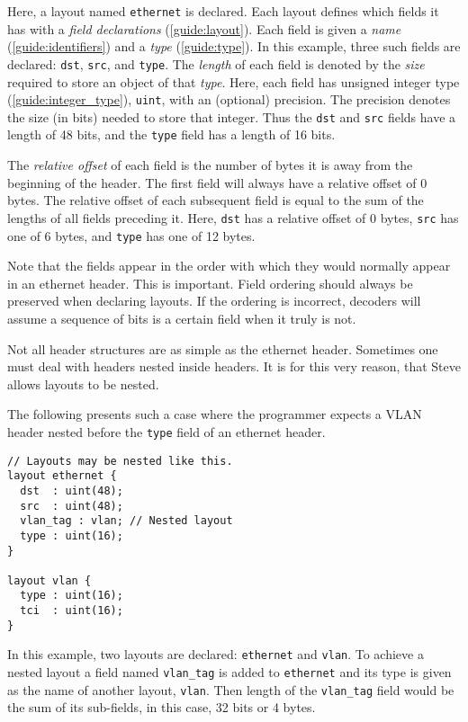 Here, a layout named \texttt{ethernet} is declared. Each layout defines which
fields it has with a \textit{field declarations} (\ref{guide:layout}). Each
field is given a \textit{name} (\ref{guide:identifiers}) and a \textit{type}
(\ref{guide:type}). In this example, three such fields are declared: \texttt{dst},
\texttt{src}, and \texttt{type}. The \textit{length} of each field is denoted by
the \textit{size} required to store an object of that \textit{type}. Here, each
field has unsigned integer type (\ref{guide:integer_type}), \texttt{uint}, with
an (optional) precision. The precision denotes the size (in bits) needed to
store that integer. Thus the \texttt{dst} and \texttt{src} fields have a length
of 48 bits, and the \texttt{type} field has a length of 16 bits.

The \textit{relative offset} of each field is the number of bytes it is away
from the beginning of the header. The first field will always have a relative
offset of 0 bytes. The relative offset of each subsequent field is equal to the
sum of the lengths of all fields preceding it. Here, \texttt{dst} has a relative
offset of 0 bytes, \texttt{src} has one of 6 bytes, and \texttt{type} has one of
12 bytes.

Note that the fields appear in the order with which they would normally appear
in an ethernet header. This is important. Field ordering should always be
preserved when declaring layouts. If the ordering is incorrect, decoders will
assume a sequence of bits is a certain field when it truly is not.

Not all header structures are as simple as the ethernet header. Sometimes one
must deal with headers nested inside headers. It is for this very reason, that
Steve allows layouts to be nested.

The following presents such a case where the programmer expects a VLAN header
\cite{vlan_std} nested before the \texttt{type} field of an ethernet
header.

\begin{codepage}
\begin{lstlisting}
// Layouts may be nested like this.
layout ethernet {
  dst  : uint(48);
  src  : uint(48);
  vlan_tag : vlan; // Nested layout
  type : uint(16);
}

layout vlan {
  type : uint(16);
  tci  : uint(16);
}
\end{lstlisting}
\end{codepage}

In this example, two layouts are declared: \texttt{ethernet} and \texttt{vlan}. To
achieve a nested layout a field named \texttt{vlan\_tag} is added to
\texttt{ethernet} and its type is given as the name of another layout,
\texttt{vlan}. Then length of the \texttt{vlan\_tag} field would be the sum of
its sub-fields, in this case, 32 bits or 4 bytes.

